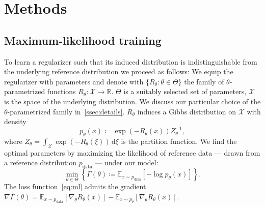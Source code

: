 \documentclass[twocolumn]{article}
\newcommand{\R}{\mathbb{R}}
\newcommand{\Function}[3]{#1\colon#2\to#3}
\newcommand{\set}[1]{\mathcal{#1}}
\begin{document}
\section{Methods}%
\label{sec:methods}
\subsection{Maximum-likelihood training}%
\label{ssec:methods ml}
To learn a regularizer such that its induced distribution is indistinguishable from the underlying reference distribution we proceed as follows:
We equip the regularizer with parameters and denote with \( \{ R_\theta : \theta \in \Theta \} \) the family of \( \theta \)-parametrized functions \( \Function{R_\theta}{\set{X}}{\R} \).
\( \Theta \) is a suitably selected set of parameters, \( \set{X} \) is the space of the underlying distribution.
We discuss our particular choice of the \( \theta \)-parametrized family in~\cref{ssec:details}.
\( R_\theta \) induces a Gibbs distribution on \( \set{X} \) with density
\begin{equation}
	p_\theta(x) \coloneqq \exp(-R_\theta(x))Z^{-1}_\theta,%
	\label{eq:gibbs}
\end{equation}
where \( Z_\theta = \int_\set{X}\exp(-R_\theta(\xi))\,\mathrm{d}\xi \) is the partition function.
We find the optimal parameters by maximizing the likelihood of reference data --- drawn from a reference distribution \( p_\text{data} \) --- under our model:
\begin{equation}
	\min_{\theta \in \Theta} \left\{ \Gamma(\theta) \coloneqq \mathbb{E}_{x\sim p_{\text{data}}}[-\log p_{\theta}(x)] \right\}.%
	\label{eq:ml}
\end{equation}
The loss function~\cref{eq:ml} admits the gradient~\cite{hinton_training_2002} \( \nabla \Gamma(\theta) = \mathbb{E}_{x\sim p_\text{data}} [\nabla_\theta R_\theta(x)] - \mathbb{E}_{x\sim p_\theta} [\nabla_\theta R_\theta(x)] \).
\end{document}
